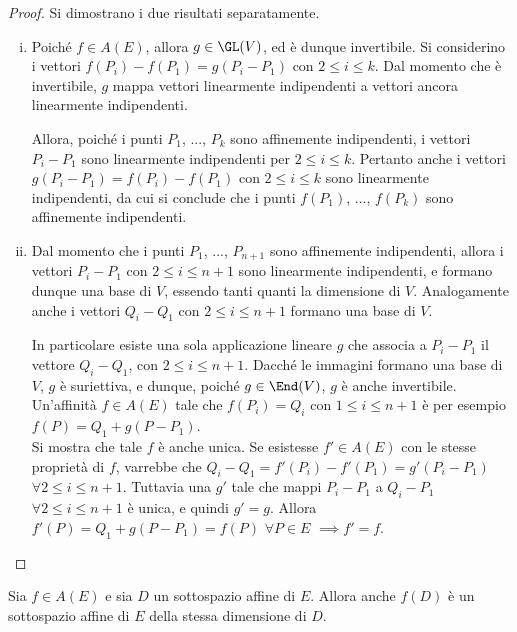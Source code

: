 \documentclass[11pt]{article}
\begin{document}
	\begin{proof}
		Si dimostrano i due risultati separatamente.
		
		\begin{enumerate}[(i)]
			\item Poiché $f \in A(E)$, allora $g \in \GL(V)$, ed è
			dunque invertibile. Si considerino i vettori $f(P_i) - f(P_1) = g(P_i - P_1)$
			con $2 \leq i \leq k$. Dal momento che è invertibile,
			$g$ mappa vettori linearmente indipendenti a vettori
			ancora linearmente indipendenti.
			
			Allora, poiché i punti
			$P_1$, ..., $P_k$ sono affinemente indipendenti, i
			vettori $P_i - P_1$ sono linearmente indipendenti per
			$2 \leq i \leq k$. Pertanto anche i vettori $g(P_i - P_1) = f(P_i) - f(P_1)$ con $2 \leq i \leq k$ sono linearmente indipendenti, da cui si conclude che i punti $f(P_1)$, ...,
			$f(P_k)$ sono affinemente indipendenti.
			
			\item Dal momento che i punti $P_1$, ..., $P_{n+1}$ sono
			affinemente indipendenti, allora i vettori $P_i - P_1$ con
			$2 \leq i \leq n+1$ sono linearmente indipendenti, e formano
			dunque una base di $V$, essendo tanti quanti la dimensione
			di $V$. Analogamente anche i vettori $Q_i - Q_1$ con $2 \leq i \leq n+1$ formano una base di $V$.

			In particolare esiste una sola applicazione lineare $g$ che
			associa a $P_i - P_1$ il vettore $Q_i - Q_1$, con $2 \leq i \leq n+1$. Dacché le immagini formano una base di $V$, $g$ è suriettiva,
			e dunque, poiché $g \in \End(V)$, $g$ è anche invertibile.
			Un'affinità $f \in A(E)$ tale che $f(P_i) = Q_i$ con $1 \leq i \leq n+1$ è per esempio $f(P) = Q_1 + g(P - P_1)$. \\
			
			Si mostra che tale $f$ è anche unica. Se esistesse $f' \in A(E)$
			con le stesse proprietà di $f$, varrebbe che $Q_i - Q_1 = f'(P_i) - f'(P_1) =  g'(P_i - P_1)$ $\forall 2 \leq i \leq n+1$. Tuttavia
			una $g'$ tale che mappi $P_i - P_1$ a $Q_i - P_1$ $\forall 2 \leq i \leq n+1$ è unica, e quindi $g' = g$. Allora $f'(P) = Q_1 + g(P - P_1) = f(P)$ $\forall P \in E$ $\implies f' = f$. \qedhere
		\end{enumerate}
	\end{proof}
	
	\begin{proposition}
		Sia $f \in A(E)$ e sia $D$ un sottospazio affine di $E$. Allora anche $f(D)$ è un sottospazio affine di $E$ della
		stessa dimensione di $D$.
	\end{proposition}
	
\end{document}
